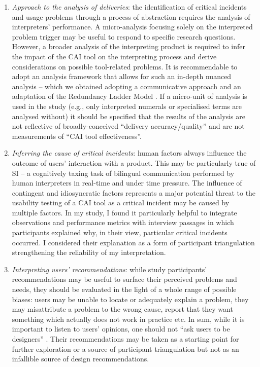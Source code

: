 \begin{enumerate}
\item \textit{Approach to the analysis of deliveries}: the identification of critical incidents and usage problems through a process of abstraction requires the analysis of interpreters’ performance. A micro-analysis focusing solely on the interpreted problem trigger may be useful to respond to specific research questions. However, a broader analysis of the interpreting product is required to infer the impact of the CAI tool on the interpreting process and derive considerations on possible tool-related problems. It is recommendable to adopt an analysis framework that allows for such an in-depth nuanced analysis  --  which we obtained adopting a communicative approach and an adaptation of the Redundancy Ladder Model \citep{frittella2019a}. If a micro-unit of analysis is used in the study (e.g., only interpreted numerals or specialised terms are analysed without) it should be specified that the results of the analysis are not reflective of broadly-conceived ``delivery accuracy\slash quality'' and are not measurements of ``CAI tool effectiveness''.
\item \textit{Inferring the cause of critical incidents}: human factors always influence the outcome of users’ interaction with a product. This may be particularly true of SI  --  a cognitively taxing task of bilingual communication performed by human interpreters in real-time and under time pressure. The influence of contingent and idiosyncratic factors represents a major potential threat to the usability testing of a CAI tool as a critical incident may be caused by multiple factors. In my study, I found it particularly helpful to integrate observations and performance metrics with interview passages in which participants explained why, in their view, particular critical incidents occurred. I considered their explanation as a form of participant triangulation strengthening the reliability of my interpretation.
\item \textit{Interpreting users’ recommendations}: while study participants’ recommendations may be useful to surface their perceived problems and needs, they should be evaluated in the light of a whole range of possible biases: users may be unable to locate or adequately explain a problem, they may misattribute a problem to the wrong cause, report that they want something which actually does not work in practice etc. In sum, while it is important to listen to users’ opinions, one should not ``ask users to be designers'' \citep{barnum2020usability}. Their recommendations may be taken as a starting point for further exploration or a source of participant triangulation but not as an infallible source of design recommendations.

\end{enumerate}
